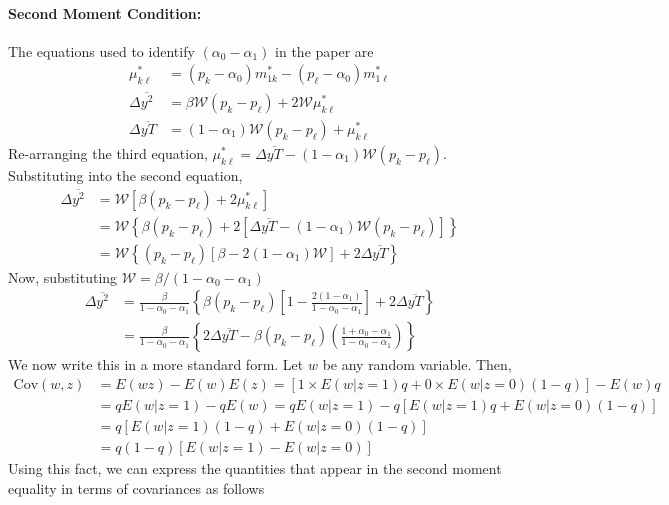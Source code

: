 \documentclass[12pt]{article}
\begin{document}
\paragraph{Second Moment Condition:}
The equations used to identify $(\alpha_0 - \alpha_1)$ in the paper are 
\begin{align*}
  \mu_{k\ell}^* &= (p_k - \alpha_0) m_{1k}^* - (p_\ell - \alpha_0) m_{1\ell}^* \\
  \Delta \overline{y^2} &= \beta \mathcal{W} (p_k - p_\ell) + 2 \mathcal{W} \mu_{k\ell}^*\\
  \Delta \overline{yT} &= (1 - \alpha_1) \mathcal{W} (p_k - p_\ell) + \mu_{k\ell}^*
\end{align*}
Re-arranging the third equation,
$\mu_{k\ell}^* = \Delta \overline{yT} - (1 - \alpha_1) \mathcal{W} (p_k - p_\ell)$.
Substituting into the second equation, 
\begin{align*}
  \Delta\overline{y^2} &= \mathcal{W}\left[ \beta(p_k - p_\ell) + 2 \mu_{k\ell}^* \right]\\
  &= \mathcal{W}\left\{ \beta(p_k - p_\ell) + 2\left[ \Delta\overline{yT} - (1 - \alpha_1)\mathcal{W}(p_k - p_\ell) \right]  \right\}\\
  &= \mathcal{W} \left\{ (p_k - p_\ell)\left[ \beta - 2(1 - \alpha_1)\mathcal{W} \right] + 2\Delta\overline{yT} \right\}
\end{align*}
Now, substituting $\mathcal{W} = \beta/(1 - \alpha_0 - \alpha_1)$
\begin{align*}
  \Delta\overline{y^2}&= \frac{\beta}{1 - \alpha_0 - \alpha_1}\left\{\beta (p_k - p_\ell)\left[ 1 - \frac{2(1 - \alpha_1)}{1 - \alpha_0 - \alpha_1} \right] + 2 \Delta\overline{yT} \right\}\\
  &= \frac{\beta}{1 - \alpha_0 - \alpha_1}\left\{2\Delta\overline{yT} - \beta(p_k - p_\ell)\left( \frac{1 + \alpha_0 - \alpha_1}{1 - \alpha_0 - \alpha_1} \right)  \right\}
\end{align*}
We now write this in a more standard form.
Let $w$ be any random variable. 
Then,
\begin{align*}
  \mbox{Cov}(w,z) &= E(wz) - E(w)E(z) = \left[ 1 \times E(w|z=1)q + 0 \times E(w|z=0)(1 - q) \right] - E(w)q\\
  &= q E(w|z=1) - qE(w) = q E(w|z=1) - q\left[ E(w|z=1)q + E(w|z=0)(1 - q) \right]\\
  &= q\left[ E(w|z=1)(1 - q) + E(w|z=0)(1 - q)\right]\\
  &= q(1-q)\left[ E(w|z=1) - E(w|z=0) \right]
\end{align*}
Using this fact, we can express the quantities that appear in the second moment equality in terms of covariances as follows
\end{document}
